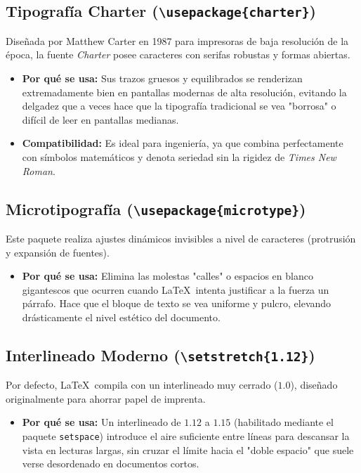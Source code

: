 \documentclass[11pt, a4paper]{article}
\begin{document}
\subsection{Tipografía Charter (\texttt{\textbackslash usepackage\{charter\}})}
Diseñada por Matthew Carter en 1987 para impresoras de baja resolución de la época, la fuente \textit{Charter} posee caracteres con serifas robustas y formas abiertas. 
\begin{itemize}
    \item \textbf{Por qué se usa:} Sus trazos gruesos y equilibrados se renderizan extremadamente bien en pantallas modernas de alta resolución, evitando la delgadez que a veces hace que la tipografía tradicional se vea "borrosa" o difícil de leer en pantallas medianas.
    \item \textbf{Compatibilidad:} Es ideal para ingeniería, ya que combina perfectamente con símbolos matemáticos y denota seriedad sin la rigidez de \textit{Times New Roman}.
\end{itemize}

\subsection{Microtipografía (\texttt{\textbackslash usepackage\{microtype\}})}
Este paquete realiza ajustes dinámicos invisibles a nivel de caracteres (protrusión y expansión de fuentes).
\begin{itemize}
    \item \textbf{Por qué se usa:} Elimina las molestas "calles" o espacios en blanco gigantescos que ocurren cuando \LaTeX\ intenta justificar a la fuerza un párrafo. Hace que el bloque de texto se vea uniforme y pulcro, elevando drásticamente el nivel estético del documento.
\end{itemize}

\subsection{Interlineado Moderno (\texttt{\textbackslash setstretch\{1.12\}})}
Por defecto, \LaTeX\ compila con un interlineado muy cerrado ($1.0$), diseñado originalmente para ahorrar papel de imprenta.
\begin{itemize}
    \item \textbf{Por qué se usa:} Un interlineado de $1.12$ a $1.15$ (habilitado mediante el paquete \texttt{setspace}) introduce el aire suficiente entre líneas para descansar la vista en lecturas largas, sin cruzar el límite hacia el "doble espacio" que suele verse desordenado en documentos cortos.
\end{itemize}
\end{document}
